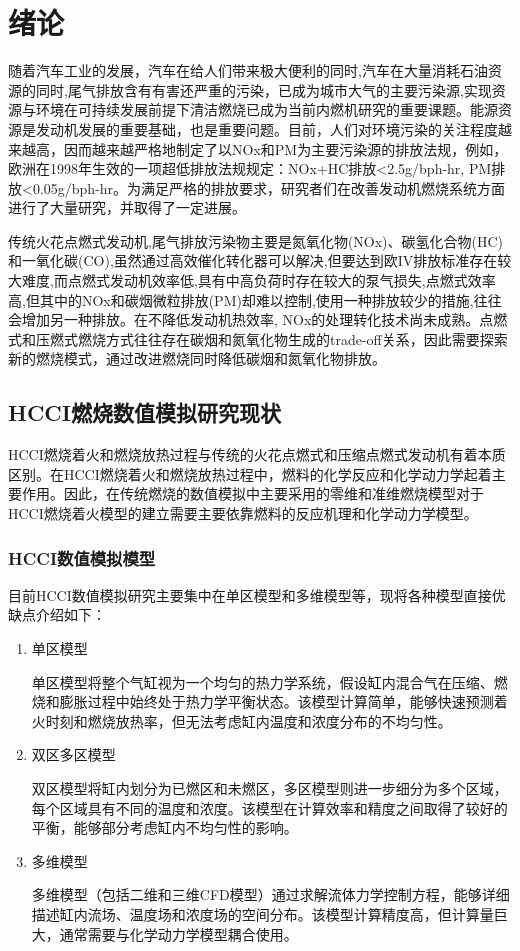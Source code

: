 \chapter{绪论}

随着汽车工业的发展，汽车在给人们带来极大便利的同时,汽车在大量消耗石油资源的同时,尾气排放含有有害还严重的污染，已成为城市大气的主要污染源,实现资源与环境在可持续发展前提下清洁燃烧已成为当前内燃机研究的重要课题。能源资源是发动机发展的重要基础，也是重要问题。目前，人们对环境污染的关注程度越来越高，因而越来越严格地制定了以NOx和PM为主要污染源的排放法规，例如，欧洲在1998年生效的一项超低排放法规规定：NOx+HC排放<2.5g/bph-hr, PM排放<0.05g/bph-hr。为满足严格的排放要求，研究者们在改善发动机燃烧系统方面进行了大量研究，并取得了一定进展\cite{zhang1998forest}。

传统火花点燃式发动机,尾气排放污染物主要是氮氧化物(NOx)、碳氢化合物(HC)和一氧化碳(CO),虽然通过高效催化转化器可以解决,但要达到欧IV排放标准存在较大难度,而点燃式发动机效率低,具有中高负荷时存在较大的泵气损失,点燃式效率高,但其中的NOx和碳烟微粒排放(PM)却难以控制,使用一种排放较少的措施,往往会增加另一种排放。在不降低发动机热效率, NOx的处理转化技术尚未成熟。点燃式和压燃式燃烧方式往往存在碳烟和氮氧化物生成的trade-off关系，因此需要探索新的燃烧模式，通过改进燃烧同时降低碳烟和氮氧化物排放。

\section{HCCI燃烧数值模拟研究现状}

HCCI燃烧着火和燃烧放热过程与传统的火花点燃式和压缩点燃式发动机有着本质区别。在HCCI燃烧着火和燃烧放热过程中，燃料的化学反应和化学动力学起着主要作用。因此，在传统燃烧的数值模拟中主要采用的零维和准维燃烧模型对于HCCI燃烧着火模型的建立需要主要依靠燃料的反应机理和化学动力学模型。

\subsection{HCCI数值模拟模型}

目前HCCI数值模拟研究主要集中在单区模型和多维模型等\cite{chineseacademy1990}，现将各种模型直接优缺点介绍如下：

\begin{enumerate}
	\item 单区模型

	单区模型将整个气缸视为一个均匀的热力学系统，假设缸内混合气在压缩、燃烧和膨胀过程中始终处于热力学平衡状态。该模型计算简单，能够快速预测着火时刻和燃烧放热率，但无法考虑缸内温度和浓度分布的不均匀性。

	\item 双区多区模型

	双区模型将缸内划分为已燃区和未燃区，多区模型则进一步细分为多个区域，每个区域具有不同的温度和浓度。该模型在计算效率和精度之间取得了较好的平衡，能够部分考虑缸内不均匀性的影响。

	\item 多维模型

	多维模型（包括二维和三维CFD模型）通过求解流体力学控制方程，能够详细描述缸内流场、温度场和浓度场的空间分布。该模型计算精度高，但计算量巨大，通常需要与化学动力学模型耦合使用。
\end{enumerate}

